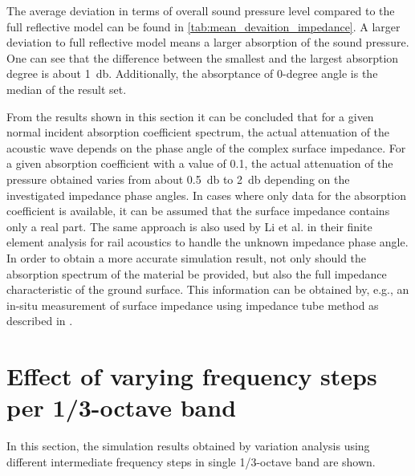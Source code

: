 The average deviation in terms of overall sound pressure level compared to the full reflective model can be found in \cref{tab:mean_devaition_impedance}. A larger deviation to full reflective model means a larger absorption of the sound pressure. One can see that the difference between the smallest and the largest absorption degree is about \SI{1}{\decibel}. Additionally, the absorptance of 0-degree angle is the median of the result set.

From the results shown in this section it can be concluded that for a given normal incident absorption coefficient spectrum, the actual attenuation of the acoustic wave depends on the phase angle of the complex surface impedance. For a given absorption coefficient with a value of 0.1, the actual attenuation of the pressure obtained varies from about \SI{0.5}{\decibel} to \SI{2}{\decibel} depending on the investigated impedance phase angles. In cases where only data for the absorption coefficient is available, it can be assumed that the surface impedance contains only a real part. The same approach is also used by Li et al. \cite{li_25d_2021} in their finite element analysis for rail acoustics to handle the unknown impedance phase angle. In order to obtain a more accurate simulation result, not only should the absorption spectrum of the material be provided, but also the full impedance characteristic of the ground surface. This information can be obtained by, e.g., an in-situ measurement of surface impedance using impedance tube method as described in \cite{hald_situ_2019, wolkesson_2013}.

\section{Effect of varying frequency steps per 1/3-octave band}

In this section, the simulation results obtained by variation analysis using different intermediate frequency steps in single 1/3-octave band are shown.

